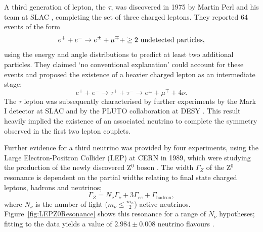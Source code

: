 A third generation of lepton, the $\tau$, was discovered in 1975 by Martin Perl and his team at SLAC \cite{Perl1975}, completing the set of three charged leptons.  They reported 64 events of the form
\begin{equation}
  e^+ + e^- \rightarrow e^{\pm} + \mu^{\mp} + \ge 2 \textnormal{ undetected particles},
\end{equation}
using the energy and angle distributions to predict at least two additional particles.  They claimed `no conventional explanation' could account for these events and proposed the existence of a heavier charged lepton as an intermediate stage:
\begin{equation}
  e^+ + e^- \rightarrow \tau^+ + \tau^- \rightarrow e^{\pm} + \mu^{\mp} + 4\nu.
\end{equation}
The $\tau$ lepton was subsequently characterised by further experiments by the Mark I detector at SLAC \cite{Feldman1977} and by the PLUTO collaboration at DESY \cite{Burmester1977}.  This result heavily implied the existence of an associated neutrino to complete the symmetry observed in the first two lepton couplets.

Further evidence for a third neutrino was provided by four experiments, using the Large Electron-Positron Collider (LEP) at CERN in 1989, which were studying the production of the newly discovered Z$^0$ boson \cite{DeCamp1989,Adeva1989,Akrawy1989,Aarnio1989}.  The width $\Gamma_Z$ of the Z$^0$ resonance is dependent on the partial widths relating to final state charged leptons, hadrons and neutrinos;
\begin{equation}
  \Gamma_Z = N_{\nu} \Gamma_{\nu} + 3 \Gamma_{ee} + \Gamma_{\mathrm{hadron}},
\end{equation}
where $N_{\nu}$ is the number of light ($m_{\nu} \le \frac{m_Z}{2}$) active neutrinos.  Figure~\ref{fig:LEPZ0Resonance} shows this resonance for a range of $N_{\nu}$ hypotheses; fitting to the data yields a value of $2.984 \pm 0.008$ neutrino flavours \cite{Schael2006}.

